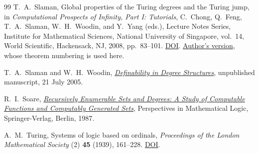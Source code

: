 \begin{thebibliography}{99}
T.~A.~Slaman,
Global properties of the Turing degrees and the Turing jump,
in \emph{Computational Prospects of Infinity, Part I: Tutorials},
C.~Chong, Q.~Feng, T.~A.~Slaman, W.~H.~Woodin,
and Y.~Yang (eds.),
Lecture Notes Series, Institute for Mathematical Sciences,
National University of Singapore, vol.~14,
World Scientific, Hackensack, NJ, 2008, pp.~83--101.
\href{https://doi.org/10.1142/9789812794055_0002}{DOI}.
\href{https://math.berkeley.edu/~slaman/papers/IMS_slaman.pdf}{Author's version},
whose theorem numbering is used here.

T.~A.~Slaman and W.~H.~Woodin,
\href{https://math.berkeley.edu/~slaman/talks/sw.pdf}{\emph{Definability in Degree Structures}},
unpublished manuscript, 21 July 2005.

R.~I.~Soare,
\href{https://link.springer.com/book/9783540666813}{\emph{Recursively Enumerable Sets and Degrees:
A Study of Computable Functions and Computably Generated Sets}},
Perspectives in Mathematical Logic,
Springer-Verlag, Berlin, 1987.

A.~M.~Turing,
Systems of logic based on ordinals,
\emph{Proceedings of the London Mathematical Society}
(2) \textbf{45} (1939), 161--228.
\href{https://doi.org/10.1112/plms/s2-45.1.161}{DOI}.

\end{thebibliography}
\endgroup
